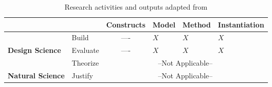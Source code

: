 
\begin{table}[bp]
   \setlength{\arrayrulewidth}{0.1mm}
    \setlength{\tabcolsep}{3pt}
    \renewcommand{\arraystretch}{1.5}

    \centering{}
 
    \caption{Research activities and outputs 
    adapted from \citep{march1995design}}
    \label{table:research-activity}
    
    \begin{tabularx}
    {\columnwidth}{|l|l|X|X|X|X|} 
    
     \arrayrulecolor[HTML]{06000A}
       
        \hline
         \rowcolor[HTML]{FFFFFF}& & Constructs & Model & Method & Instantiation \\
        \hline
   
\cellcolor[HTML]{ECB4E8} &Build	&  	\multicolumn{1}{c|}{ \cellcolor[HTML]{ECB4E8} ---- }& \cellcolor[HTML]{ECB4E8}$X$ & \cellcolor[HTML]{ECB4E8}$X$ & \cellcolor[HTML]{ECB4E8}$X$	\\    \cline{2-2}\cline{4-6}
\multirow{-2}{*}{\cellcolor[HTML]{ECB4E8} \textbf{Design Science}} & Evaluate & 	\multicolumn{1}{c|}{ \cellcolor[HTML]{ECB4E8}----}&  \cellcolor[HTML]{ECB4E8}$X$ & \cellcolor[HTML]{ECB4E8}$X$ & \cellcolor[HTML]{ECB4E8}$X$
		\\  \hline 

\cellcolor[HTML]{BFCEED} &Theorize	& 	\multicolumn{4}{c|}{ \cellcolor[HTML]{BFCEED} --Not Applicable--}	\\  \cline{2-2}
\multirow{-2}{*}{\cellcolor[HTML]{BFCEED} \textbf{Natural Science}} & Justify & 	\multicolumn{4}{c|}{ \cellcolor[HTML]{BFCEED}--Not Applicable--}	\\   \hline


    \end{tabularx}

\end{table}







